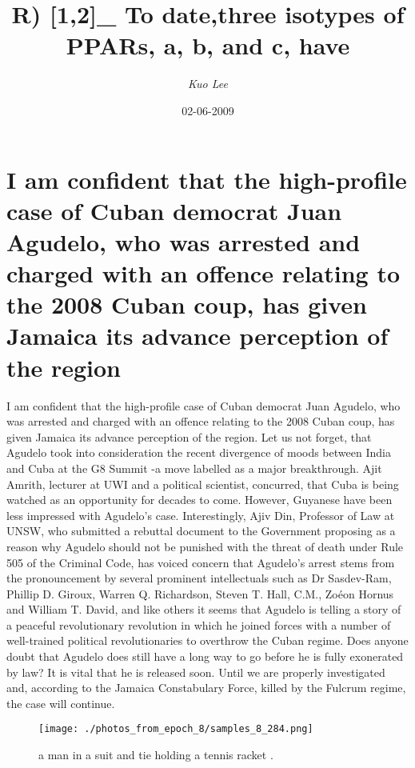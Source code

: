 \documentclass{article}%
\title{R) {[}1,2{]}\_ To date,three isotypes of PPARs, a, b, and c, have}%
\author{\textit{Kuo Lee}}%
\date{02-06-2009}%
\begin{document}
%
\normalsize%
\maketitle%
\section{I am confident that the high{-}profile case of Cuban democrat Juan Agudelo, who was arrested and charged with an offence relating to the 2008 Cuban coup, has given Jamaica its advance perception of the region}%
\label{sec:Iamconfidentthatthehigh{-}profilecaseofCubandemocratJuanAgudelo,whowasarrestedandchargedwithanoffencerelatingtothe2008Cubancoup,hasgivenJamaicaitsadvanceperceptionoftheregion}%
I am confident that the high{-}profile case of Cuban democrat Juan Agudelo, who was arrested and charged with an offence relating to the 2008 Cuban coup, has given Jamaica its advance perception of the region.\newline%
Let us not forget, that Agudelo took into consideration the recent divergence of moods between India and Cuba at the G8 Summit {-}a move labelled as a major breakthrough. Ajit Amrith, lecturer at UWI and a political scientist, concurred, that Cuba is being watched as an opportunity for decades to come.\newline%
However, Guyanese have been less impressed with Agudelo's case. Interestingly, Ajiv Din, Professor of Law at UNSW, who submitted a rebuttal document to the Government proposing as a reason why Agudelo should not be punished with the threat of death under Rule 505 of the Criminal Code, has voiced concern that Agudelo's arrest stems from the pronouncement by several prominent intellectuals such as Dr Sasdev{-}Ram, Phillip D. Giroux, Warren Q. Richardson, Steven T. Hall, C.M., Zoéon Hornus and William T. David, and like others it seems that Agudelo is telling a story of a peaceful revolutionary revolution in which he joined forces with a number of well{-}trained political revolutionaries to overthrow the Cuban regime.\newline%
Does anyone doubt that Agudelo does still have a long way to go before he is fully exonerated by law? It is vital that he is released soon. Until we are properly investigated and, according to the Jamaica Constabulary Force, killed by the Fulcrum regime, the case will continue.\newline%

%


\begin{figure}[h!]%
\centering%
\texttt{[image: ./photos\_from\_epoch\_8/samples\_8\_284.png]}%
\caption{a man in a suit and tie holding a tennis racket .}%
\end{figure}

%
\end{document}

